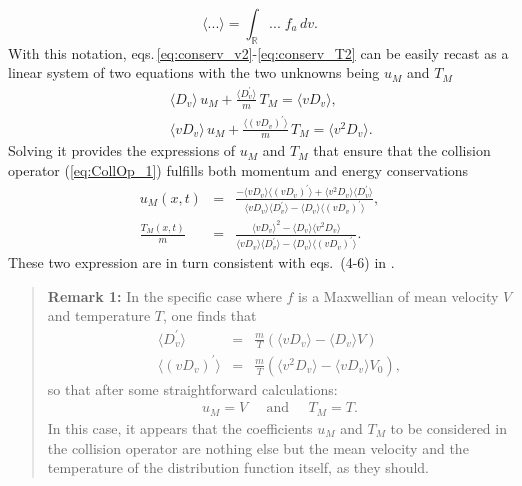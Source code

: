 \documentclass[11pt]{article}
\begin{document}
%
\begin{equation*}
\langle ... \rangle = \int_{\mathbb{R}} ... \; f_a \, dv.
\end{equation*}
%
With this notation, eqs.\,\eqref{eq:conserv_v2}-\eqref{eq:conserv_T2} can be easily recast as a linear system of two equations with the two unknowns being $u_M$ and $T_M$
%
\begin{eqnarray}
&&  \langle D_v \rangle\, u_M + \frac{\langle D_v^\prime \rangle}{m}\, T_M 
= \langle v D_v \rangle  \label{eq:conserv_v3}, \\
&&  \langle v D_v \rangle\, u_M + 
\frac{\langle (v D_v)^\prime \rangle}{m}\, T_M 
= \langle v^2 D_v \rangle.\label{eq:conserv_T3}
\end{eqnarray}
Solving it provides the expressions of $u_M$ and $T_M$ that ensure that the collision operator (\ref{eq:CollOp_1}) fulfills both momentum and energy conservations
%
\begin{eqnarray}
u_M(x,t) &=& 
\frac{-\langle vD_v \rangle\langle (v D_v)^\prime \rangle+\langle v^2D_v \rangle\langle D_v^\prime \rangle}
{\langle vD_v \rangle\langle D_v^\prime \rangle-\langle D_v \rangle\langle (v D_v)^\prime \rangle},  \label{eq:def_VM} \\
\frac{T_M(x,t)}{m} &=&
\frac{\langle vD_v \rangle^2 - \langle D_v \rangle\langle v^2D_v \rangle}
{\langle vD_v \rangle\langle D_v^\prime \rangle-\langle D_v \rangle\langle (v D_v)^\prime \rangle}. \label{eq:def_TM}
\end{eqnarray} 
%
These two expression are in turn consistent with eqs.\ (4-6) in \cite{DifPradalier2011}.

\begin{footnotesize}
\begin{quotation}
	\textbf{Remark 1:} In the specific case where $f$ is a Maxwellian of mean velocity $V$ and temperature $T$, one finds that
	\begin{eqnarray*}
	\langle D_v^\prime \rangle &=& \frac{m}{T}\left( 
	  \langle vD_v \rangle - \langle D_v \rangle V\right) \\
	\langle (vD_v)^\prime \rangle &=& \frac{m}{T}\left( 
    	\langle v^2D_v \rangle - \langle vD_v \rangle V_0\right),
	\end{eqnarray*}
	so that after some straightforward calculations:
	\begin{eqnarray*}
		u_M = V \;\;\;\;\; \textrm{and} \;\;\;\;\; T_M = T.
	\end{eqnarray*}
	In this case, it appears that the coefficients $u_M$ and $T_M$ to be considered in the collision operator are nothing else but the mean velocity and the temperature of the distribution function itself, as they should.
\end{quotation}
\end{footnotesize}
\end{document}

